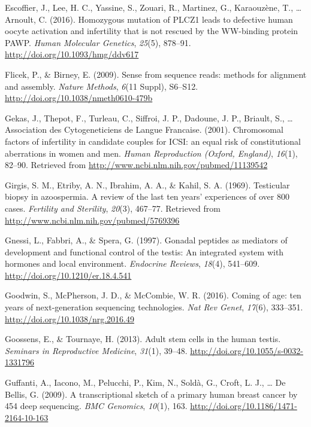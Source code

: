 \documentclass[12pt,twoside]{reedthesis}
\theoremstyle{definition}
\theoremstyle{definition}
\theoremstyle{remark}
\begin{document}
  \hypertarget{ref-Escoffier2016}{}
  Escoffier, J., Lee, H. C., Yassine, S., Zouari, R., Martinez, G.,
  Karaouzène, T., \ldots{} Arnoult, C. (2016). Homozygous mutation of
  PLCZ1 leads to defective human oocyte activation and infertility that is
  not rescued by the WW-binding protein PAWP. \emph{Human Molecular
  Genetics}, \emph{25}(5), 878--91.
  \url{http://doi.org/10.1093/hmg/ddv617}
  
  \hypertarget{ref-Flicek2009}{}
  Flicek, P., \& Birney, E. (2009). Sense from sequence reads: methods for
  alignment and assembly. \emph{Nature Methods}, \emph{6}(11 Suppl),
  S6--S12. \url{http://doi.org/10.1038/nmeth0610-479b}
  
  \hypertarget{ref-Gekas2001}{}
  Gekas, J., Thepot, F., Turleau, C., Siffroi, J. P., Dadoune, J. P.,
  Briault, S., \ldots{} Association des Cytogeneticiens de Langue
  Francaise. (2001). Chromosomal factors of infertility in candidate
  couples for ICSI: an equal risk of constitutional aberrations in women
  and men. \emph{Human Reproduction (Oxford, England)}, \emph{16}(1),
  82--90. Retrieved from \url{http://www.ncbi.nlm.nih.gov/pubmed/11139542}
  
  \hypertarget{ref-Girgis}{}
  Girgis, S. M., Etriby, A. N., Ibrahim, A. A., \& Kahil, S. A. (1969).
  Testicular biopsy in azoospermia. A review of the last ten years'
  experiences of over 800 cases. \emph{Fertility and Sterility},
  \emph{20}(3), 467--77. Retrieved from
  \url{http://www.ncbi.nlm.nih.gov/pubmed/5769396}
  
  \hypertarget{ref-Gnessi1997}{}
  Gnessi, L., Fabbri, A., \& Spera, G. (1997). Gonadal peptides as
  mediators of development and functional control of the testis: An
  integrated system with hormones and local environment. \emph{Endocrine
  Reviews}, \emph{18}(4), 541--609.
  \url{http://doi.org/10.1210/er.18.4.541}
  
  \hypertarget{ref-Goodwin2016}{}
  Goodwin, S., McPherson, J. D., \& McCombie, W. R. (2016). Coming of age:
  ten years of next-generation sequencing technologies. \emph{Nat Rev
  Genet}, \emph{17}(6), 333--351. \url{http://doi.org/10.1038/nrg.2016.49}
  
  \hypertarget{ref-Goossens2013}{}
  Goossens, E., \& Tournaye, H. (2013). Adult stem cells in the human
  testis. \emph{Seminars in Reproductive Medicine}, \emph{31}(1), 39--48.
  \url{http://doi.org/10.1055/s-0032-1331796}
  
  \hypertarget{ref-Guffanti2009}{}
  Guffanti, A., Iacono, M., Pelucchi, P., Kim, N., Soldà, G., Croft, L.
  J., \ldots{} De Bellis, G. (2009). A transcriptional sketch of a primary
  human breast cancer by 454 deep sequencing. \emph{BMC Genomics},
  \emph{10}(1), 163. \url{http://doi.org/10.1186/1471-2164-10-163}
  
\end{document}
